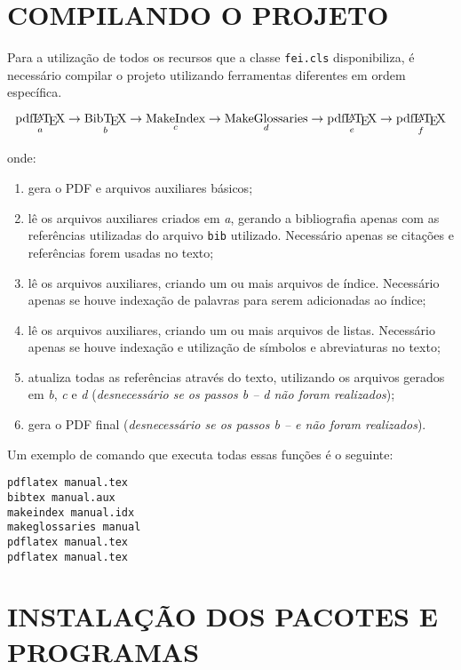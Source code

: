 \documentclass[xindy,rascunho]{fei}
\begin{document}
\begin{teorema}
	\chapter{COMPILANDO O PROJETO} \label{chap:compilando}
	
	Para a utilização de todos os recursos que a classe \texttt{fei.cls} disponibiliza, é necessário compilar o projeto utilizando ferramentas diferentes em ordem específica.
	
	\[\operatorname*{\text{pdf\LaTeX}}_a \to \operatorname*{\text{Bib\TeX}}_b \to \operatorname*{\text{MakeIndex}}_c \to \operatorname*{\text{MakeGlossaries}}_d \to \operatorname*{\text{pdf\LaTeX}}_e \to \operatorname*{\text{pdf\LaTeX}}_f\]
	
	onde:
	
	\begin{enumerate}
	\item gera o PDF e arquivos auxiliares básicos;
	\item lê os arquivos auxiliares criados em \emph{a}, gerando a bibliografia apenas com as referências utilizadas do arquivo \texttt{bib} utilizado. Necessário apenas se citações e referências forem usadas no texto;
	\item lê os arquivos auxiliares, criando um ou mais arquivos de índice. Necessário apenas se houve indexação de palavras para serem adicionadas ao índice;
	\item lê os arquivos auxiliares, criando um ou mais arquivos de listas. Necessário apenas se houve indexação e utilização de símbolos e abreviaturas no texto;
	\item atualiza todas as referências através do texto, utilizando os arquivos gerados em \emph{b}, \emph{c} e \emph{d} (\emph{desnecessário se os passos b -- d não foram realizados});
	\item gera o PDF final (\emph{desnecessário se os passos b -- e não foram realizados}).
	\end{enumerate}
	
	Um exemplo de comando que executa todas essas funções é o seguinte:
	
	\begin{verbatim}
pdflatex manual.tex
bibtex manual.aux
makeindex manual.idx
makeglossaries manual
pdflatex manual.tex
pdflatex manual.tex
	\end{verbatim}
	
	\chapter{INSTALAÇÃO DOS PACOTES E PROGRAMAS}	\label{chap:instalacao}
	

\end{teorema}
\end{document}
